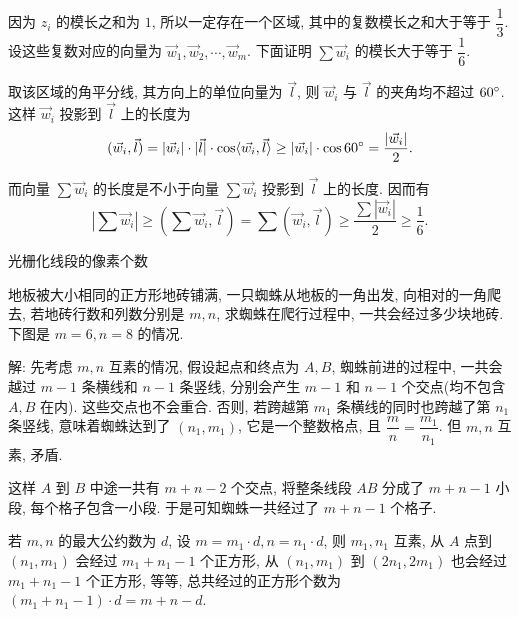 因为 $z_i$ 的模长之和为 $1$, 所以一定存在一个区域, 其中的复数模长之和大于等于 $\dfrac{1}{3}$. 设这些复数对应的向量为 $\vec{w}_1, \vec{w}_2,\cdots,\vec{w}_m$. 下面证明 $\sum \vec{w}_i$ 的模长大于等于 $\dfrac{1}{6}$.

取该区域的角平分线, 其方向上的单位向量为 $\vec{l}$, 则 $\vec{w}_i$ 与 $\vec{l}$ 的夹角均不超过 $60\degree$. 这样 $\vec{w}_i$ 投影到 $\vec{l}$ 上的长度为
\[ (\vec{w}_i, \vec{l}) = |\vec{w}_i|\cdot|\vec{l}|\cdot\cos\langle\vec{w_i},\vec{l}\rangle \ge |\vec{w}_i|\cdot\cos 60\degree = \frac{|\vec{w}_i|}{2} .\]

而向量 $\sum\vec{w}_i$ 的长度是不小于向量 $\sum\vec{w}_i$ 投影到 $\vec{l}$ 上的长度. 因而有
\[|\sum\vec{w}_i| \ge (\sum\vec{w}_i, \vec{l}) = \sum(\vec{w}_i,\vec{l}) \ge \frac{\sum|\vec{w}_i|}{2}\ge \frac{1}{6} .\]

\newpage

\noindent 光栅化线段的像素个数

地板被大小相同的正方形地砖铺满, 一只蜘蛛从地板的一角出发, 向相对的一角爬去, 若地砖行数和列数分别是 $m,n$, 求蜘蛛在爬行过程中, 一共会经过多少块地砖. 下图是 $m = 6, n = 8$ 的情况.
\begin{figure*}[htbp]
\centering
{}
\end{figure*}

解: 先考虑 $m,n$ 互素的情况, 假设起点和终点为 $A,B$, 蜘蛛前进的过程中, 一共会越过 $m - 1$ 条横线和 $n - 1$ 条竖线, 分别会产生 $m - 1$ 和 $n - 1$ 个交点(均不包含 $A,B$ 在内). 这些交点也不会重合. 否则, 若跨越第 $m_1$ 条横线的同时也跨越了第 $n_1$ 条竖线, 意味着蜘蛛达到了 $(n_1, m_1)$, 它是一个整数格点, 且 $\dfrac{m}{n} = \dfrac{m_1}{n_1}$. 但 $m,n$ 互素, 矛盾. 

这样 $A$ 到 $B$ 中途一共有 $m+n-2$  个交点, 将整条线段 $AB$ 分成了 $m+n-1$ 小段, 每个格子包含一小段. 于是可知蜘蛛一共经过了 $m+n-1$ 个格子.

若 $m,n$ 的最大公约数为 $d$, 设 $m = m_1\cdot d, n = n_1\cdot d$, 则 $m_1, n_1$ 互素, 从 $A$ 点到 $(n_1,m_1)$ 会经过 $m_1+n_1-1$ 个正方形, 从 $(n_1,m_1)$ 到 $(2n_1,2m_1)$ 也会经过 $m_1+n_1-1$ 个正方形, 等等, 总共经过的正方形个数为 $(m_1+n_1-1)\cdot d = m+n-d$.

